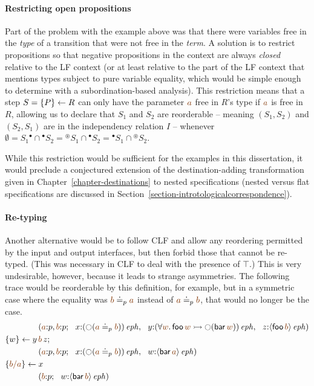 \paragraph{Restricting open propositions} Part of the problem with the
example above was that there were variables free in the {\it type} of
a transition that were not free in the {\it term}.  A solution is to
restrict propositions so that negative propositions in the context are
always {\it closed} relative to the LF context (or at least relative
to the part of the LF context that mentions types subject to pure
variable equality, which would be simple enough to determine with a
subordination-based analysis). This restriction means that a step $S =
\{{P}\} \leftarrow {R}$ can only have the parameter $\lf{a}$ free in $R$'s type
if $\lf{a}$ is free in $R$, allowing us to declare that $S_1$ and
$S_2$ are reorderable -- meaning $(S_1,S_2)$ and $(S_2,S_1)$ are in the
independency relation $I$ -- whenever
$\emptyset = S_1{^\bullet} \cap {^\bullet}S_2 = {^\circledast}S_1 \cap
{^\bullet}S_2 = {^\bullet}S_1 \cap {^\circledast}S_2$. 

While this
restriction would be sufficient for the examples in this dissertation, it
would preclude a conjectured extension of the destination-adding
transformation given in Chapter~\ref{chapter-destinations} to nested
specifications (nested versus flat specifications are discussed in
Section~\ref{section-introtologicalcorrespondence}).

\paragraph{Re-typing}
Another alternative would be to follow CLF and allow
any reordering permitted by the input and output interfaces, but then
forbid those that cannot be re-typed. (This was necessary in CLF to
deal with the presence of $\top$.) This is very undesirable, however, 
because it leads to strange asymmetries. The following trace would be 
reorderable by this definition, for example, but in a symmetric case where
the equality was $\lf{b} \doteq_p \lf{a}$ instead of  
$\lf{a} \doteq_p \lf{b}$, that would no longer be the case.
\begin{align*}
& \qquad\qquad
(\lf{a}{:}p, \lf{b}{:}p; ~~ x{:}\iseph{\left({\ocircle}(\lf{a} \doteq_p \lf{b})\right)}, ~~
 y{:}\iseph{\left(\forall \lf{w}.\,{\sf foo}\,\lf{w} 
                 \lefti {\ocircle}({\sf bar}\, \lf{w})\right)}, ~~
 z{:}\iseph{\susp{{\sf foo}\,\lf{b}}})
\\
& \trstep{w}{y\,\lf{b}\,z};
\\
& \qquad\qquad
(\lf{a}{:}p, \lf{b}{:}p; ~~ x{:}\iseph{\left({\ocircle}(\lf{a} \doteq_p \lf{b})\right)}, ~~
 w{:}\iseph{\susp{{\sf bar}\,\lf{a}}})
\\
& \trstep{\lf{b/a}}{x}
\\
& \qquad\qquad
(\lf{b}{:}p; ~~ w{:}\iseph{\susp{{\sf bar}\,\lf{b}}})
\end{align*}

